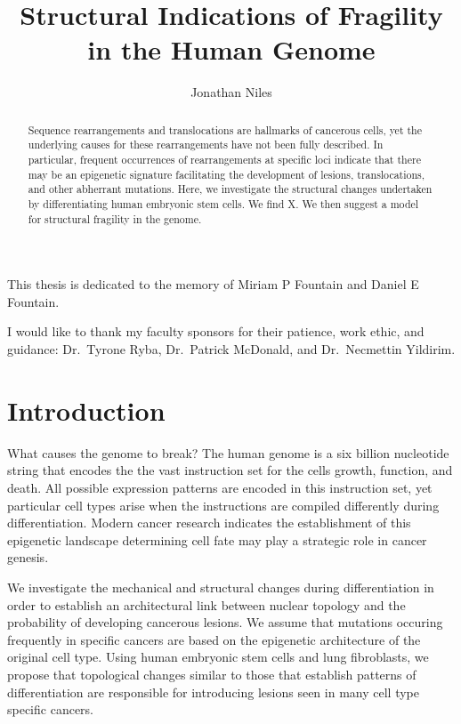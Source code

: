 \documentclass[phd,tocprelim]{cornell}
\title{Structural Indications of Fragility in the Human Genome}
\author{Jonathan Niles}
\begin{document}
\maketitle
\makecopyright%

\begin{abstract}
Sequence rearrangements and translocations are hallmarks of cancerous cells, yet the underlying causes for these rearrangements have
not been fully described.  In particular, frequent occurrences of rearrangements at specific loci indicate that there may be an
epigenetic signature facilitating the development of lesions, translocations, and other abherrant mutations.  Here, we investigate
the structural changes undertaken by differentiating human embryonic stem cells.  We find X.
We then suggest a model for structural fragility in the genome.
\end{abstract}

\begin{dedication}
  This thesis is dedicated to the memory of Miriam P Fountain and Daniel E Fountain.
\end{dedication}

\begin{acknowledgements}
I would like to thank my faculty sponsors for their patience, work ethic, and guidance:  Dr.\ Tyrone Ryba, Dr.\ Patrick McDonald,
and Dr.\ Necmettin Yildirim.
\end{acknowledgements}

\contentspage%
\tablelistpage%
\figurelistpage%

\normalspacing\setcounter{page}{1}
\pagestyle{cornell} \addtolength{\parskip}{0.5\baselineskip}

\chapter{Introduction}

What causes the genome to break?  The human genome is a six billion nucleotide string that encodes the
the vast instruction set for the cells growth, function, and death.  All possible expression patterns are
encoded in this instruction set, yet particular cell types arise when the instructions are compiled differently
during differentiation.  Modern cancer research indicates the establishment of this epigenetic landscape
determining cell fate may play a strategic role in cancer genesis.


We investigate the mechanical and structural changes during differentiation in order to establish an
architectural link between nuclear topology and the probability of developing cancerous lesions.  We
assume that mutations occuring frequently in specific cancers are based on the epigenetic architecture
of the original cell type.  Using human embryonic stem cells and lung fibroblasts, we propose that
topological changes similar to those that establish patterns of differentiation are responsible for
introducing lesions seen in many cell type specific cancers.
\end{document}
